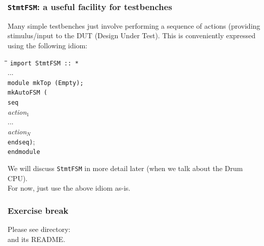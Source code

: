 \begin{frame}[fragile]
\frametitle{{\tt StmtFSM}: a useful facility for testbenches}

\footnotesize

Many simple testbenches just involve performing a sequence of actions
(providing stimulus/input to the DUT (Design Under Test).  This is
conveniently expressed using the following {\BSV} idiom:

\vspace{2ex}

{\small
\begin{tabbing}
\hmmm \= \hm \= \hm \= \hm \= \kill
      \> {\tt import StmtFSM :: *} \\
      \> ... \\
      \> {\tt module mkTop (Empty);} \\
      \>     \> {\tt mkAutoFSM (} \\
      \>     \>     \> {\tt seq} \\
      \>     \>     \>     \> \emph{action$_1$} \\
      \>     \>     \>     \> ... \\
      \>     \>     \>     \> \emph{action$_N$} \\
      \>     \>     \> {\tt endseq)}; \\
      \> {\tt endmodule}
\end{tabbing}}


\vspace*{4ex}

We will discuss {\tt StmtFSM} in more detail later (when we talk about
the Drum CPU).  \\
For now, just use the above idiom as-is.

\end{frame}


\begin{frame}[fragile]
\frametitle{\EmojiExercise \hmm Exercise break}

Please see directory:  \\
and its README.

\end{frame}


